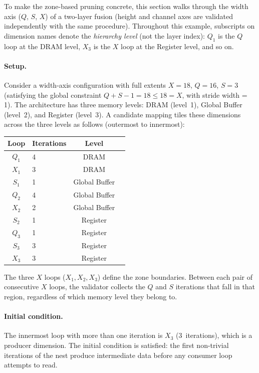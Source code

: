 To make the zone-based pruning concrete, this section walks through
the width axis ($Q$, $S$, $X$) of a two-layer fusion (height and channel axes are
validated independently with the same procedure).
Throughout this example, subscripts on dimension names denote the
\emph{hierarchy level} (not the layer index): $Q_1$ is the $Q$ loop
at the DRAM level, $X_3$ is the $X$ loop at the Register level,
and so on.

\paragraph{Setup.}
Consider a width-axis configuration with full extents
$X = 18$, $Q = 16$, $S = 3$ (satisfying the global constraint
$Q + S - 1 = 18 \le 18 = X$, with stride width = 1).
The architecture has three memory levels: DRAM (level~1), Global
Buffer (level~2), and Register (level~3).
A candidate mapping tiles these dimensions across the three levels as
follows (outermost to innermost):

\begin{center}
\small
\begin{tabular}{c l c l}
  \toprule
  \textbf{Loop} & \textbf{Iterations} & \textbf{Level} \\
  \midrule
    $Q_1$ & 4 & DRAM \\
    $X_1$ & 3 & DRAM \\
    $S_1$ & 1 & Global Buffer \\
    $Q_2$ & 4 & Global Buffer \\
    $X_2$ & 2 & Global Buffer \\
    $S_2$ & 1 & Register \\
    $Q_3$ & 1 & Register \\
    $S_3$ & 3 & Register \\
    $X_3$ & 3 & Register \\
  \bottomrule
\end{tabular}
\end{center}

\noindent
The three $X$ loops ($X_1, X_2, X_3$) define the zone boundaries.
Between each pair of consecutive $X$ loops, the validator collects the
$Q$ and $S$ iterations that fall in that region, regardless of which
memory level they belong to.

\paragraph{Initial condition.}
The innermost loop with more than one iteration is $X_3$
(3~iterations), which is a producer dimension.
The initial condition is satisfied: the first non-trivial iterations
of the nest produce intermediate data before any consumer loop
attempts to read.

